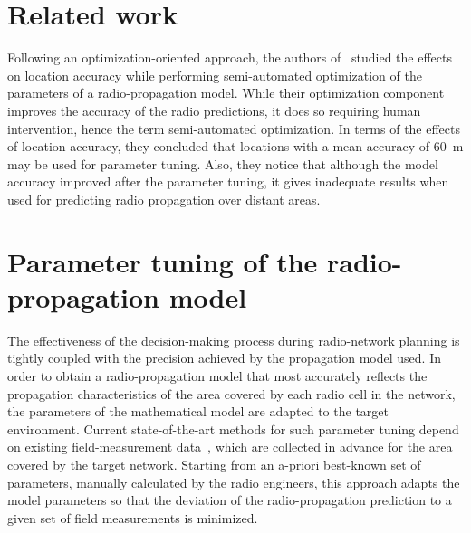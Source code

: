 \section{Related work \label{sec:05-Related_work}}

Following an optimization-oriented approach, the authors of~\cite{Aarnaes-Tuning_of_empirical_radio_propagation_models_effect_of_location_accuracy:2004}
studied the effects on location accuracy while performing semi-automated
optimization of the parameters of a radio-propagation model. While
their optimization component improves the accuracy of the radio predictions,
it does so requiring human intervention, hence the term semi-automated
optimization. In terms of the effects of location accuracy, they concluded
that locations with a mean accuracy of 60~m may be used for parameter
tuning. Also, they notice that although the model accuracy improved
after the parameter tuning, it gives inadequate results when used
for predicting radio propagation over distant areas.




\section{Parameter tuning of the radio-propagation model \label{sec:05-Parameter_tuning_radio-propagation_model}}

The effectiveness of the decision-making process during radio-network
planning is tightly coupled with the precision achieved by the propagation
model used. In order to obtain a radio-propagation model that most
accurately reflects the propagation characteristics of the area covered
by each radio cell in the network, the parameters of the mathematical
model are adapted to the target environment. Current state-of-the-art
methods for such parameter tuning depend on existing field-measurement
data~\cite{Aarnaes-Tuning_of_empirical_radio_propagation_models_effect_of_location_accuracy:2004,Yang_A_linear_least_square_method_of_propagation_model_tuning_for_3G_radion_network_planning:2008},
which are collected in advance for the area covered by the target
network. Starting from an a-priori best-known set of parameters, manually
calculated by the radio engineers, this approach adapts the model
parameters so that the deviation of the radio-propagation prediction
to a given set of field measurements is minimized.

